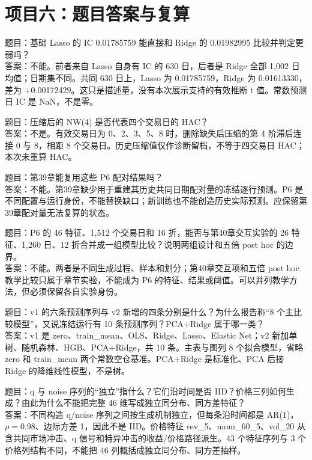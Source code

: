 \clearpage\section*{项目六：题目答案与复算}
\color{inkiron}
题目：基础 Lasso 的 IC 0.01785759 能直接和 Ridge 的 0.01982995 比较并判定更弱吗？\\
答案：不能。前者来自 Lasso 自身有 IC 的 630 日，后者是 Ridge 全部 1,002 日均值；日期集不同。共同 630 日上，Lasso 为 0.01785759，Ridge 为 0.01613330，差为 +0.00172429。这只是描述量，没有本次展示支持的有效推断 t 值。常数预测日 IC 是 NaN，不是零。

\clearpage
{}
题目：压缩后的 NW(4) 是否代表四个交易日的 HAC？\\
答案：不是。有效交易日为 0、2、3、5、8 时，删除缺失后压缩的第 4 阶滞后连接 0 与 8，相距 8 个交易日。历史压缩值仅作诊断留档，不等于四交易日 HAC；本次未重算 HAC。

\clearpage
{}
题目：第39章能复用这些 P6 配对结果吗？\\
答案：不能。第39章缺少用于重建其历史共同日期配对量的冻结逐行预测。P6 是不同配置与运行身份，不能替换缺口；新训练也不能创造历史实际预测。应保留第39章配对量无法复算的状态。

\clearpage
{}
题目：P6 的 46 特征、1,512 个交易日和 16 折，能否与第40章交互实验的 26 特征、1,260 日、12 折合并成一组模型比较？说明两组设计和五倍 post hoc 的边界。\\
答案：不能。两者是不同生成过程、样本和划分；第40章交互项和五倍 post hoc 教学比较只属于章节实验，不能成为 P6 的特征、结果或阈值。可以并列教学方法，但必须保留各自实验身份。

\clearpage
{}
题目：v1 的六条预测序列与 v2 新增的四条分别是什么？为什么报告称“8 个主比较模型”，又说冻结运行有 10 条预测序列？PCA+Ridge 属于哪一类？\\
答案：v1 是 zero、train\_mean、OLS、Ridge、Lasso、Elastic Net；v2 新加单树、随机森林、HGB、PCA+Ridge，共 10 条。主表与图列 8 个拟合模型，省略 zero 和 train\_mean 两个常数空仓基准。PCA+Ridge 是标准化、PCA 后接 Ridge 的降维线性模型，不是树。

\clearpage
{}
题目：q 与 noise 序列的“独立”指什么？它们沿时间是否 IID？价格三列如何生成？由此为什么不能把完整 46 维写成独立同分布、同方差特征？\\
答案：不同构造 q/noise 序列之间按生成机制独立，但每条沿时间都是 AR(1)，\(\rho=0.98\)、边际方差 1，因此不是 IID。价格特征 rev\_5、mom\_60\_5、vol\_20 从含共同市场冲击、q 信号和特异冲击的收益/价格路径派生。43 个特征序列与 3 个价格列结构不同，不能把 46 列概括成独立同分布、同方差抽样。

